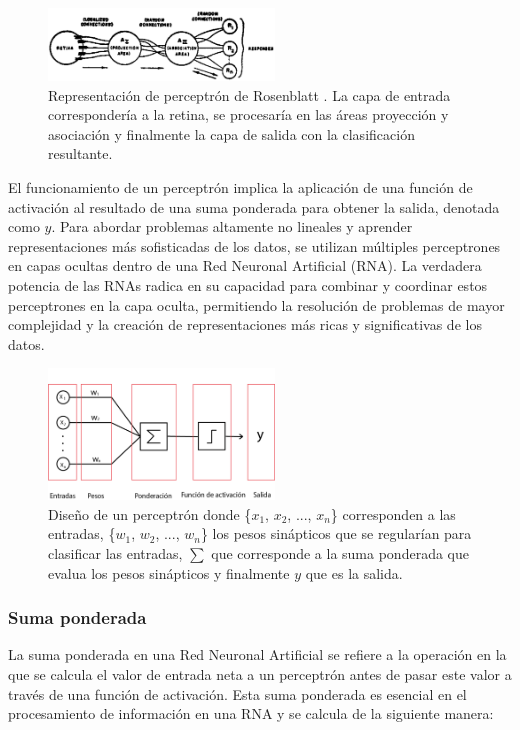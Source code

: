 \documentclass[journal]{IEEEtai}
\begin{document}
\begin{figure}[H]
\centering
\includegraphics[width=6cm]{img/FIGURAS/perceptron.png}
\caption{Representación de perceptrón de Rosenblatt \cite{Rosenblatt}. La capa de entrada correspondería a la retina, se procesaría en las áreas proyección y asociación y finalmente la capa de salida con la clasificación resultante.}
\label{fig: OriginalP}
\end{figure}

El funcionamiento de un perceptrón implica la aplicación de una función de activación al resultado de una suma ponderada para obtener la salida, denotada como $y$.
Para abordar problemas altamente no lineales y aprender representaciones más sofisticadas de los datos, se utilizan múltiples perceptrones en capas ocultas dentro de una Red Neuronal Artificial (RNA). La verdadera potencia de las RNAs radica en su capacidad para combinar y coordinar estos perceptrones en la capa oculta, permitiendo la resolución de problemas de mayor complejidad y la creación de representaciones más ricas y significativas de los datos.

\begin{figure}[H]
\centering
\includegraphics[width=6cm]{img/FIGURAS/fig1.png}
\caption{Diseño de un perceptrón donde \{$x_1$, $x_2$, ..., $x_n$\} corresponden a las entradas, \{$w_1$, $w_2$, ..., $w_n$\} los pesos sinápticos que se regularían para clasificar las entradas,   $\sum$ que corresponde a la suma ponderada que evalua los pesos sinápticos y finalmente $y$ que es la salida.}
\label{fig: Perceptrón}
\end{figure}

\hfill \break

\subsubsection{Suma ponderada}

La suma ponderada en una Red Neuronal Artificial se refiere a la operación en la que se calcula el valor de entrada neta a un perceptrón antes de pasar este valor a través de una función de activación. Esta suma ponderada es esencial en el procesamiento de información en una RNA y se calcula de la siguiente manera:
\end{document}
